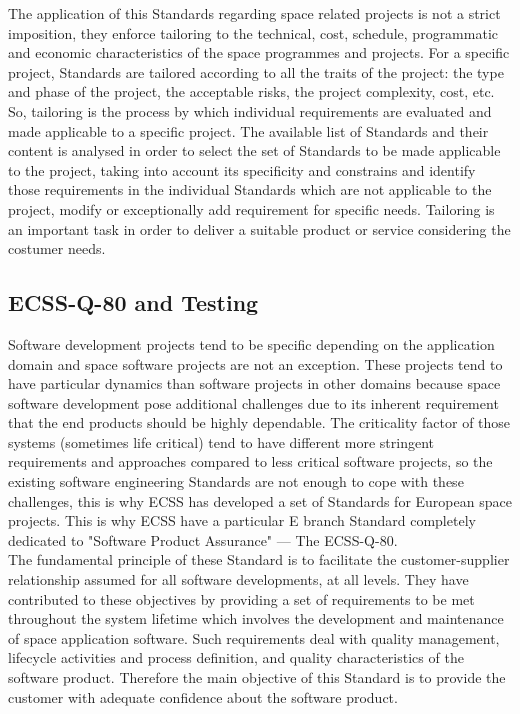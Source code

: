 The application of this Standards regarding space related projects is not a strict imposition, they enforce
tailoring to the technical, cost, schedule, programmatic and economic characteristics of the space programmes and projects.
For a specific project, Standards are tailored according to all the traits of the project: the type and 
phase of the project, the acceptable risks, the project complexity, cost, etc.
So, tailoring is the process by which individual requirements are evaluated and made applicable to a specific project.
The available list of Standards and their content is analysed in order to select the set of Standards to be made applicable to the project, taking 
into account its specificity and constrains and identify those requirements in the individual Standards which are not 
applicable to the project, modify or exceptionally add requirement for specific needs\cite{ecss-s-st-00c}.
Tailoring is an important task in order to deliver a suitable product or service considering the costumer needs.

\subsection{ECSS-Q-80 and Testing}\label{sec:stand}
Software development projects tend to be specific depending on the application domain and 
space software projects are not an exception. These projects tend to have particular dynamics than software projects
in other domains because space software development pose additional challenges due to its inherent
requirement that the end products should be highly dependable.
The criticality factor of those systems (sometimes life critical) tend to have different more stringent requirements and approaches 
compared to less critical software projects, so
the existing software engineering Standards are not enough to cope with these challenges, this is why \ac{ECSS} has developed a set of Standards for European
space projects\cite{Ahmad2010AgileECSS,10.1109/SESS.1997.595952}.
This is why \ac{ECSS} have a particular E branch Standard completely dedicated to "Software Product Assurance" --- The ECSS-Q-80\cite{ecss-q-st-80c}.\\

The fundamental principle of these Standard is to facilitate the
customer-supplier relationship assumed for all software developments, at all levels.
They have contributed to these objectives by providing a set of requirements to be
met throughout the system lifetime which involves the development and
maintenance of space application software. Such requirements deal with quality
management, lifecycle activities and process definition, and quality
characteristics of the software product\cite{Mattiello-FranciscoSanAmbJogCos:2007:BrSoIn}.
Therefore the main objective of this Standard is to provide the customer with adequate confidence about the software product.\\

